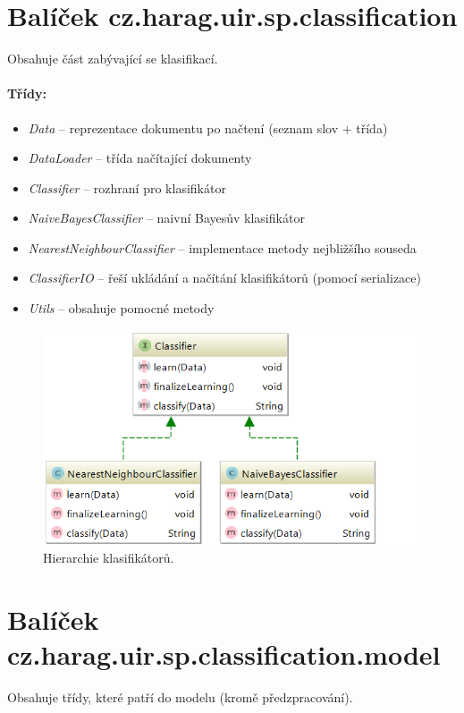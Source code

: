 \documentclass[12pt, a4paper]{report}
\begin{document}
\section{Balíček cz.harag.uir.sp.classification}
Obsahuje část zabývající se klasifikací.

\paragraph{Třídy:}
\begin{itemize}
	\item \emph{Data} -- reprezentace dokumentu po načtení (seznam slov + třída)
	\item \emph{DataLoader} -- třída načítající dokumenty
	
	\item \emph{Classifier} -- rozhraní pro klasifikátor
	\item \emph{NaiveBayesClassifier} -- naivní Bayesův klasifikátor
	\item \emph{NearestNeighbourClassifier} -- implementace metody nejbližšího souseda
	\item \emph{ClassifierIO} -- řeší ukládání a načítání klasifikátorů (pomocí serializace)
	
	\item \emph{Utils} -- obsahuje pomocné metody
\end{itemize}

\begin{figure}[h]
	\centering
	\includegraphics[width=0.8\linewidth]{img-class-h}
	\caption{Hierarchie klasifikátorů.}
	\label{fig:img-class-h}
\end{figure}

\section{Balíček cz.harag.uir.sp.classification.model}
Obsahuje třídy, které patří do modelu (kromě předzpracování).
\end{document}
